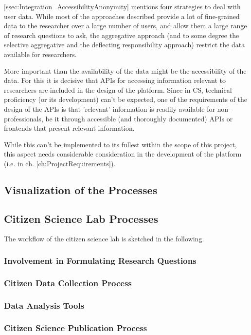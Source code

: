 \ref{ssec:Integration_AccessibilityAnonymity} mentions four strategies to deal with user data. While most of the approaches described provide a lot of fine-grained data to the researcher over a large number of users, and allow them a large range of research questions to ask, the aggregative approach (and to some degree the selective aggregative and the deflecting responsibility approach) restrict the data available for researchers. 

More important than the availability of the data might be the accessibility of the data. For this it is decisive that APIs for accessing information relevant to researchers are included in the design of the platform. Since in CS, technical proficiency (or its development) can't be expected, one of the requirements of the design of the APIs is that 'relevant' information is readily available for non-professionals, be it through accessible (and thoroughly documented) APIs or frontends that present relevant information.

While this can't be implemented to its fullest within the scope of this project, this aspect needs considerable consideration in the development of the platform (i.e. in ch. \ref{ch:ProjectRequirements}).

\subsection{Visualization of the Processes}
\label{sec:Model_Visualization}

\subsection{Citizen Science Lab Processes}
\label{sec:CSLab_Processes}


The workflow of the citizen science lab is sketched in the following.

\subsubsection{Involvement in Formulating Research Questions}

\subsubsection{Citizen Data Collection Process}

\subsubsection{Data Analysis Tools}

\subsubsection{Citizen Science Publication Process}